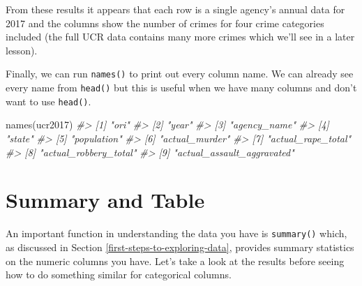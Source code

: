 \documentclass[
]{krantz}
\makeatletter
\newenvironment{Shaded}{\begin{snugshade}}{\end{snugshade}}
\newcommand{\CommentTok}[1]{\textcolor[rgb]{0.37,0.37,0.37}{\textit{#1}}}
\newcommand{\FunctionTok}[1]{\textcolor[rgb]{0,0,0}{#1}}
\newcommand{\NormalTok}[1]{#1}
\newenvironment{kframe}{%
\medskip{}
\setlength{\fboxsep}{.8em}
 \def\at@end@of@kframe{}%
 \ifinner\ifhmode%
  \def\at@end@of@kframe{\end{minipage}}%
  \begin{minipage}{\columnwidth}%
 \fi\fi%
 \def\FrameCommand##1{\hskip\@totalleftmargin \hskip-\fboxsep
 \colorbox{shadecolor}{##1}\hskip-\fboxsep
     \hskip-\linewidth \hskip-\@totalleftmargin \hskip\columnwidth}%
 \MakeFramed {\advance\hsize-\width
   \@totalleftmargin\z@ \linewidth\hsize
   \@setminipage}}%
 {\par\unskip\endMakeFramed%
 \at@end@of@kframe}
\renewenvironment{Shaded}{\begin{kframe}}{\end{kframe}}
\makeatother
\begin{document}
From these results it appears that each row is a single agency's annual data for 2017 and the columns show the number of crimes for four crime categories included (the full UCR data contains many more crimes which we'll see in a later lesson).

Finally, we can run \texttt{names()} to print out every column name. We can already see every name from \texttt{head()} but this is useful when we have many columns and don't want to use \texttt{head()}.

\begin{Shaded}
\begin{Highlighting}[]
\FunctionTok{names}\NormalTok{(ucr2017)}
\CommentTok{\#\textgreater{} [1] "ori"                      }
\CommentTok{\#\textgreater{} [2] "year"                     }
\CommentTok{\#\textgreater{} [3] "agency\_name"              }
\CommentTok{\#\textgreater{} [4] "state"                    }
\CommentTok{\#\textgreater{} [5] "population"               }
\CommentTok{\#\textgreater{} [6] "actual\_murder"            }
\CommentTok{\#\textgreater{} [7] "actual\_rape\_total"        }
\CommentTok{\#\textgreater{} [8] "actual\_robbery\_total"     }
\CommentTok{\#\textgreater{} [9] "actual\_assault\_aggravated"}
\end{Highlighting}
\end{Shaded}

\hypertarget{summary-and-table}{%
\section{Summary and Table}\label{summary-and-table}}

An important function in understanding the data you have is \texttt{summary()} which, as discussed in Section \ref{first-steps-to-exploring-data}, provides summary statistics on the numeric columns you have. Let's take a look at the results before seeing how to do something similar for categorical columns.
\end{document}
